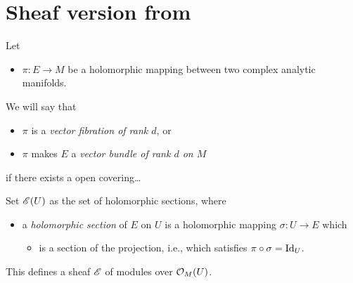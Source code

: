 \section{Sheaf version from \cite{sabbah2007isomonodromic}} %
\begin{defn}
  Let
  \begin{itemize}
    \item $\pi:E\to M$ be a holomorphic mapping between two complex analytic
      manifolds.
  \end{itemize}
  We will say that
  \begin{itemize}
    \item $\pi$ is a \emph{vector fibration of rank $d$}, or
    \item $\pi$ makes $E$ a \emph{vector bundle of rank $d$ on $M$}
  \end{itemize}
  if there exists a open covering\dots
\end{defn}
Set $\mathscr{E}(U)$ as the set of holomorphic sections, where
\begin{itemize}
  \item a \emph{holomorphic section} of $E$ on $U$ is a holomorphic mapping
    $\sigma:U\to E$ which
    \begin{itemize}
      \item is a section of the projection, i.e., which satisfies
        $\pi\circ\sigma=\operatorname{Id}_U$.
    \end{itemize}
\end{itemize}
This defines a sheaf $\mathscr{E}$ of modules over $\mathcal{O}_M(U)$.
